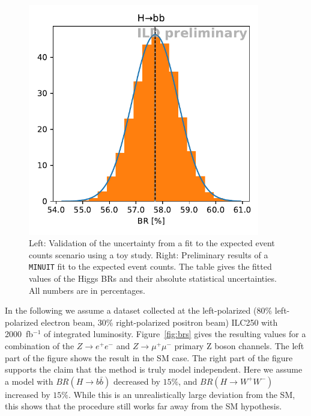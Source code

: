 \documentclass[a4paper,11pt]{article}
\begin{document}
\begin{figure}[ht]
    \begin{minipage}[c]{0.5\textwidth}
      \centering
      \includegraphics[width=0.9\textwidth, keepaspectratio]{toy_H_bb}
    \end{minipage}
    \begin{minipage}[c]{0.5\textwidth}
      \centering
      
    \end{minipage}
    \caption{
        Left: Validation of the uncertainty from
        a fit to the expected event counts scenario using a toy study.
        Right:
        Preliminary results of a \texttt{MINUIT} fit to the expected event counts.
        The table gives the fitted values of the Higgs BRs
        and their absolute statistical uncertainties.
        All numbers are in percentages.
    }\label{fig:toys}
\end{figure}

In the following we assume a dataset collected at the left-polarized
(80\% left-polarized electron beam, 30\% right-polarized positron beam)
ILC250 with 2000~fb$^{-1}$ of integrated luminosity.
Figure~\ref{fig:brs} gives the resulting values for a combination of the
$Z \to e^+e^-$ and $Z \to \mu^+\mu^-$ primary Z boson channels.
The left part of the figure shows the result in the SM case.
The right part of the figure supports the claim that the method
is truly model independent.
Here we assume a model with $BR(H \to b \bar{b})$ decreased by $15\%$,
and $BR(H \to W^+W^-)$ increased by $15\%$.
While this is an unrealistically large deviation from the SM, this shows that
the procedure still works far away from the SM hypothesis.
\end{document}
